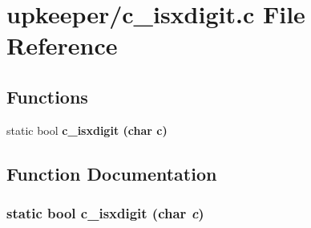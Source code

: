 \section{upkeeper/c\_\-isxdigit.c File Reference}
\label{c__isxdigit_8c}
\subsection*{Functions}
\begin{CompactItemize}
\item 
static bool \bf{c\_\-isxdigit} (char c)
\end{CompactItemize}


\subsection{Function Documentation}
\subsubsection{\setlength{\rightskip}{0pt plus 5cm}static bool c\_\-isxdigit (char {\em c})\hspace{0.3cm}{\tt  [inline, static]}}\label{c__isxdigit_8c_a962b6592665d1af0723e180120b22fa}


